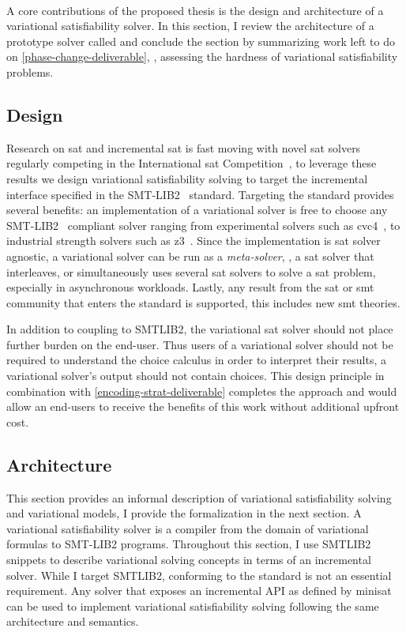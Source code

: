 ~\label{chapter:vsat}

A core contributions of the proposed thesis is the design and
architecture of a variational satisfiability solver. In this section, I review
the architecture of a prototype solver called \vsat{} and conclude the section
by summarizing work left to do on \autoref{phase-change-deliverable}, \ie{},
assessing the hardness of variational satisfiability problems.

\subsection{Design}
Research on \ac{sat} and incremental \ac{sat} is fast moving with novel \ac{sat}
solvers regularly competing in the International \ac{sat}
Competition~\cite{interSatComp}, to leverage these results we design variational
satisfiability solving to target the incremental interface specified in the
SMT-LIB2~\cite{BarFT-RR-17} standard. Targeting the standard provides several
benefits: an implementation of a variational solver is free to choose any
SMT-LIB2~\cite{BarFT-RR-17} compliant solver ranging from experimental solvers
such as cvc4~\cite{10.1007/978-3-642-22110-1_14}, to industrial strength solvers
such as z3~\cite{10.1007/978-3-540-78800-3_24}. Since the implementation is
\ac{sat} solver agnostic, a variational solver can be run as a
\emph{meta-solver}, \ie{}, a \ac{sat} solver that interleaves, or simultaneously
uses several \ac{sat} solvers to solve a \ac{sat} problem, especially in
asynchronous workloads. Lastly, any result from the \ac{sat} or \ac{smt}
community that enters the standard is supported, this includes new \ac{smt}
theories.

In addition to coupling to SMTLIB2, the variational \ac{sat} solver should not
place further burden on the end-user. Thus users of a variational solver should
not be required to understand the choice calculus in order to interpret their
results, a variational solver's output should not contain choices. This design
principle in combination with \autoref{encoding-strat-deliverable} completes the
approach and would allow an end-users to receive the benefits of this work
without additional upfront cost.

\subsection{Architecture}

This section provides an informal description of variational satisfiability
solving and variational models, I provide the formalization in the next section.
A variational satisfiability solver is a compiler from the domain of variational
formulas to SMT-LIB2 programs. Throughout this section, I use SMTLIB2 snippets
to describe variational solving concepts in terms of an incremental solver.
While I target SMTLIB2, conforming to the standard is not an essential
requirement. Any solver that exposes an incremental API as defined by
minisat~\cite{10.1007/978-3-319-09284-3_16} can be used to implement variational
satisfiability solving following the same architecture and semantics.

